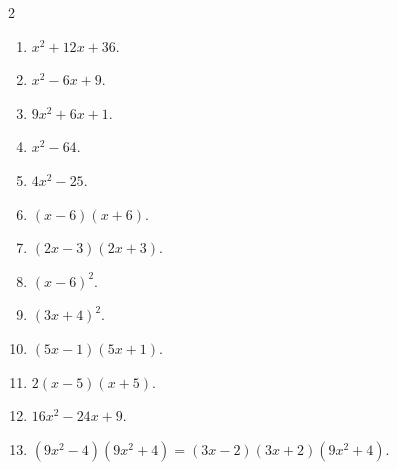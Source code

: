 \documentclass[11pt]{article}
\begin{document}
\begin{keybox}
\begin{multicols}{2}
\small
\begin{enumerate}[leftmargin=*,itemsep=3pt]
  \item $x^2+12x+36$.
  \item $x^2-6x+9$.
  \item $9x^2+6x+1$.
  \item $x^2-64$.
  \item $4x^2-25$.
  \item $(x-6)(x+6)$.
  \item $(2x-3)(2x+3)$.
  \item $(x-6)^2$.
  \item $(3x+4)^2$.
  \item $(5x-1)(5x+1)$.
  \item $2(x-5)(x+5)$.
  \item $16x^2-24x+9$.
  \item $(9x^2-4)(9x^2+4)=(3x-2)(3x+2)(9x^2+4)$.
\end{enumerate}
\end{multicols}
\end{keybox}
\end{document}
